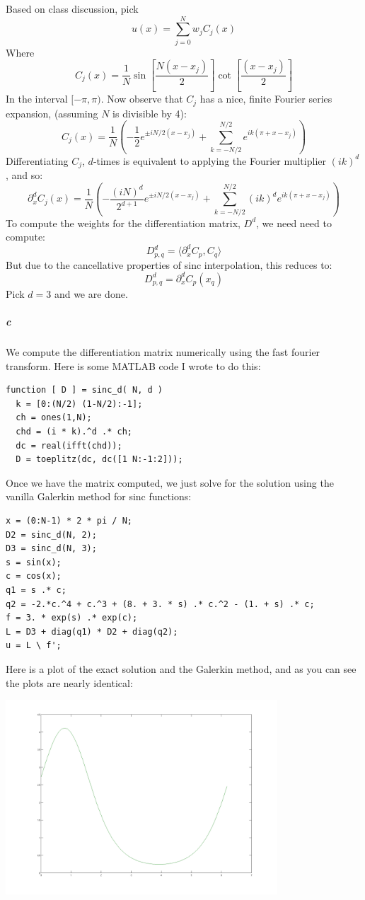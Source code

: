 \documentclass{article}
\begin{document}
Based on class discussion, pick 
\[u(x) = \sum \limits_{j=0}^N w_j C_j(x) \]
Where
\[ C_j(x) = \frac{1}{N} \sin \left[ \frac{N (x - x_j)}{2} \right] \cot \left[ \frac{(x - x_j)}{2} \right] \]
In the interval $[-\pi, \pi)$.  Now observe that $C_j$ has a nice, finite Fourier series expansion, (assuming $N$ is divisible by 4):
\[ C_j(x) = \frac{1}{N} \left( -\frac{1}{2} e^{\pm i N/2 (x - x_j)} + \sum \limits_{k=-N/2}^{N/2} e^{i k (\pi + x - x_j)} \right) \]
Differentiating $C_j$, $d$-times is equivalent to applying the Fourier multiplier $(ik)^d$, and so:
\[ \partial^d_x C_j(x) = \frac{1}{N} \left( -\frac{(iN)^d}{2^{d+1}} e^{\pm i N/2 (x - x_j)} + \sum \limits_{k=-N/2}^{N/2} (ik)^d e^{i k (\pi + x - x_j)} \right)
\]
To compute the weights for the differentiation matrix, $D^d$, we need need to compute:
\[ D^d_{p,q} = \langle \partial^d_x C_p , C_q \rangle \]
But due to the cancellative properties of sinc interpolation, this reduces to:
\[ D^d_{p,q} = \partial^d_x C_p(x_q) \]
Pick $d=3$ and we are done.

\subparagraph{c}
We compute the differentiation matrix numerically using the fast fourier transform.  Here is some MATLAB code I wrote to do this:

\begin{verbatim}
function [ D ] = sinc_d( N, d )
  k = [0:(N/2) (1-N/2):-1];
  ch = ones(1,N);
  chd = (i * k).^d .* ch;
  dc = real(ifft(chd));
  D = toeplitz(dc, dc([1 N:-1:2]));
\end{verbatim}

Once we have the matrix computed, we just solve for the solution using the vanilla Galerkin method for sinc functions:

\begin{verbatim}
x = (0:N-1) * 2 * pi / N;
D2 = sinc_d(N, 2);
D3 = sinc_d(N, 3);
s = sin(x);
c = cos(x);
q1 = s .* c;
q2 = -2.*c.^4 + c.^3 + (8. + 3. * s) .* c.^2 - (1. + s) .* c;
f = 3. * exp(s) .* exp(c);
L = D3 + diag(q1) * D2 + diag(q2);
u = L \ f';
\end{verbatim}

Here is a plot of the exact solution and the Galerkin method, and as you can see the plots are nearly identical:

\includegraphics[width=4in]{p1_soln.png}
\end{document}
